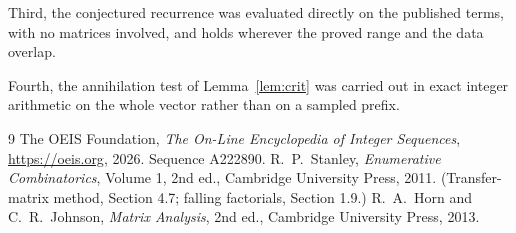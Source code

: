 \documentclass[11pt,a4paper]{article}
\theoremstyle{plain}
\theoremstyle{definition}
\begin{document}
Third, the conjectured recurrence was evaluated directly on the published terms, with no
matrices involved, and holds wherever the proved range and the data overlap.

Fourth, the annihilation test of Lemma~\ref{lem:crit} was carried out in exact integer
arithmetic on the whole vector rather than on a sampled prefix.

\begin{thebibliography}{9}
 The OEIS Foundation, \emph{The On-Line Encyclopedia of Integer
Sequences}, \url{https://oeis.org}, 2026. Sequence A222890.
 R.~P.~Stanley, \emph{Enumerative Combinatorics}, Volume 1, 2nd ed.,
Cambridge University Press, 2011. (Transfer-matrix method, Section 4.7; falling factorials,
Section 1.9.)
 R.~A.~Horn and C.~R.~Johnson, \emph{Matrix Analysis}, 2nd ed., Cambridge
University Press, 2013.
\end{thebibliography}
\end{document}
